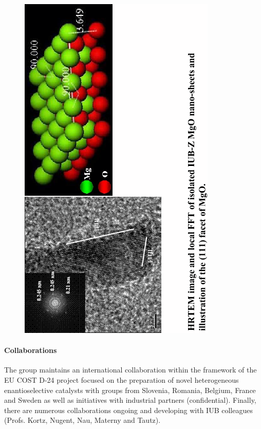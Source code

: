 \begin{figure}[ht]
  \begin{center}
    \includegraphics[height=\hsize, angle=270]{Richards/Richards_2006_Fig.png}
    \label{fig:Richards 2006 Fig}
   \end{center}
\end{figure}



\paragraph{Collaborations}
The group maintains an international collaboration within the
framework of the EU COST D-24 project focused on the preparation
of novel heterogeneous enantioselective catalysts with groups from
Slovenia, Romania, Belgium, France and Sweden as well as
initiatives with industrial partners (confidential).  Finally,
there are numerous collaborations ongoing and developing with IUB
colleagues (Profs. Kortz, Nugent, Nau, Materny and Tautz).



